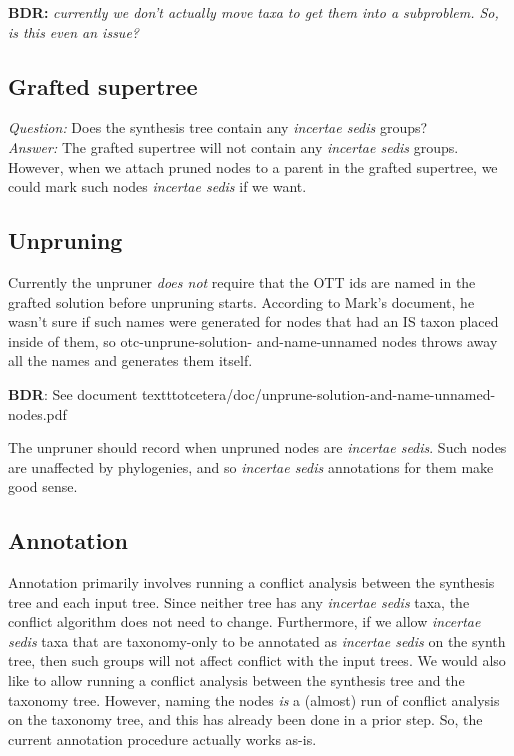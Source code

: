 \documentclass[english]{article}
\begin{document}
\textbf{BDR:} \emph{currently we don't actually move taxa to get them
into a subproblem.
So, is this even an issue?}

\subsection{Grafted supertree}

\emph{Question:} Does the synthesis tree contain any \emph{incertae
sedis} groups?\\ \emph{Answer:} The grafted supertree will not contain
any \emph{incertae sedis} groups.
However, when we attach pruned nodes
to a parent in the grafted supertree, we could mark such nodes
\emph{incertae sedis} if we want.

\subsection{Unpruning}

Currently the unpruner \emph{does not} require that the OTT ids are
named in the grafted solution before unpruning starts.
According to
Mark's document, he wasn't sure if such names were generated for nodes
that had an IS taxon placed inside of them, so otc-unprune-solution-
and-name-unnamed nodes throws away all the names and generates them
itself.

\textbf{BDR}: See document texttt{otcetera/doc/unprune-solution-and-name-unnamed-nodes.pdf}

The unpruner should record when unpruned nodes are \emph{incertae
sedis}.
Such nodes are unaffected by phylogenies, and so
\emph{incertae sedis} annotations for them make good sense.

\subsection{Annotation}

Annotation primarily involves running a conflict analysis between the
synthesis tree and each input tree.
Since neither tree has any
\emph{incertae sedis} taxa, the conflict algorithm does not need to
change.
Furthermore, if we allow \emph{incertae sedis} taxa that are
taxonomy-only to be annotated as \emph{incertae sedis} on the synth
tree, then such groups will not affect conflict with the input trees.
We would also like to allow running a conflict analysis between the
synthesis tree and the taxonomy tree.
However, naming the nodes
\emph{is} a (almost) run of conflict analysis on the taxonomy tree,
and this has already been done in a prior step.
So, the current
annotation procedure actually works as-is.
\end{document}
